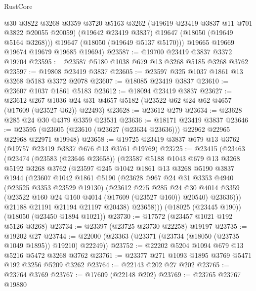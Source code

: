\begin{lexlean}{RustCore}
\begin{coremodule}
          @30
          @3822
          @3268
          @3359
          @3720
          @5163
          @3262
          (@19619 @23419 @3837 @11 @701 @3822 @20055 @20059)
          (@19642 @23419 @3837)
          @19647
          (@18050 (@19649 @5164 @3268)))
        @19647
        (@18050 (@19649 @5137 @5170)))
      @19665
      @19669
      @19674
      @19679
      @19685
      @19694)
@23587 := @19700 @23419 @3837 @3372 @19704
@23595 := @23587 @5180 @1038 @679 @13 @3268 @5185 @3268 @3762
@23597 := @19808 @23419 @3837
@23605 := @23597 @325 @1037 @1861 @13 @3268 @5183 @3372 @2078
@23607 := @18085 @23419 @3837
@23610 := @23607 @1037 @1861 @5183
@23612 := @18094 @23419 @3837
@23627 := @23612
    @267
    @1036
    @24
    @31
    @4657
    @5182
    (@23522 @62 @24 @62 @4657 (@17609 (@23527 @62)) @22493)
@23628 := @23612 @279
@23634 := @23628 @285 @24 @30 @4379 @3359 @23531
@23636 := @18171 @23419 @3837
@23646 := @23595 (@23605 (@23610 (@23627 (@23634 @23636))) @22962 @22965 @22968 @22971 @19948)
@23658 := @19725 @23419 @3837 @679 @13 @3762 (@19757 @23419 @3837 @676 @13 @3761 @19769)
@23725 := @23415
    (@23463
      (@23474
        (@23583 (@23646 @23658))
        (@23587
          @5188
          @1043
          @679
          @13
          @3268
          @5192
          @3268
          @3762
          (@23597
            @245
            @1042
            @1861
            @13
            @3268
            @5190
            @3837
            @1944
            (@23607
              @1042
              @1861
              @5190
              (@23628
                @967
                @24
                @31
                @3353
                @4940
                (@23525 @3353 @23529 @19130)
                (@23612
                  @275
                  @285
                  @24
                  @30
                  @4014
                  @3359
                  (@23522 @160 @24 @160 @4014 (@17609 (@23527 @160)) @20540)
                  @23636)))
            @21188
            @21191
            @21194
            @21197
            @20438)
          @23658)))
    (@18025 (@23445 @190))
    (@18050 (@23450 @1894 @1021))
@23730 := @17572 (@23457 @1021 @192 @5126 @3268)
@23734 := @23397 (@23725 @23730 @22258) @19197
@23735 := @19202 @27
@23744 := @22000 (@23363 (@23371 (@23734 (@18050 (@23735 @1049 @1895)) @19210) @22249))
@23752 := @22202 @5204 @1094 @679 @13 @5216 @5472 @3268 @3762
@23761 := @23377 @271 @1093 @1895 @3769 @5471 @192 @3256 @5209 @3262
@23764 := @22143 @202 @27 @202
@23765 := @23764 @3769
@23767 := @17609 (@22148 @202)
@23769 := @23765 @23767 @19880

\end{coremodule}
\end{lexlean}
